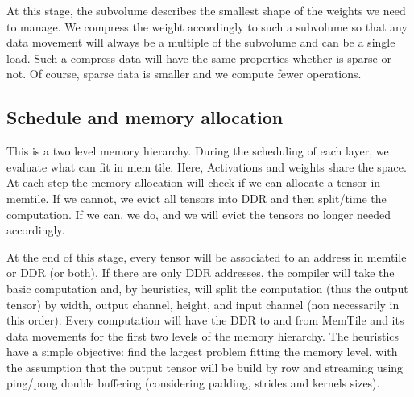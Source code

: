 \documentclass[conference]{IEEEtran}
\begin{document}
At this stage, the subvolume describes the smallest shape of the
weights we need to manage. We compress the weight accordingly to such
a subvolume so that any data movement will always be a multiple of the
subvolume and can be a single load. Such a compress data will have the
same properties whether is sparse or not. Of course, sparse data is
smaller and we compute fewer operations.


\subsection{Schedule and memory allocation}
This is a two level memory hierarchy. During the scheduling of each
layer, we evaluate what can fit in mem tile. Here, Activations and
weights share the space. At each step the memory allocation will check
if we can allocate a tensor in memtile. If we cannot, we evict all
tensors into DDR and then split/time the computation. If we can, we
do, and we will evict the tensors no longer needed accordingly.

At the end of this stage, every tensor will be associated to an
address in memtile or DDR (or both). If there are only DDR addresses,
the compiler will take the basic computation and, by heuristics, will
split the computation (thus the output tensor) by width, output
channel, height, and input channel (non necessarily in this
order). Every computation will have the DDR to and from MemTile and
its data movements for the first two levels of the memory
hierarchy. The heuristics have a simple objective: find the largest
problem fitting the memory level, with the assumption that the output
tensor will be build by row and streaming using ping/pong double
buffering (considering padding, strides and kernels sizes).
\end{document}
